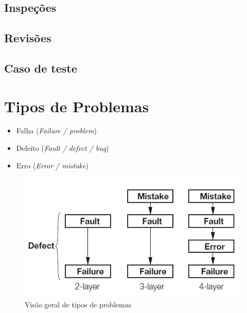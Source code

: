 \documentclass[
	12pt,				%
	openright,			%
	twoside,			%
	a4paper,			%
	english,			%
	brazil,				%
	]{abntex2}
\begin{document}
\subsection{Inspeções}


\subsection{Revisões}


\subsection{Caso de teste}

\section{Tipos de Problemas}


\begin{itemize}
    \item Falha (\emph{Failure / problem})
    \item Defeito (\emph{Fault / defect / bug})
    \item Erro (\emph{Error / mistake})
\end{itemize}

\begin{figure}[h]
    \centering
    \graphicspath{ {./graphics/} }
    \includegraphics[scale=0.8]{defeito_falha_erro}
    \caption{Visão geral de tipos de problemas}
    \label{fig:tipos_problemas}
\end{figure}

\end{document}

